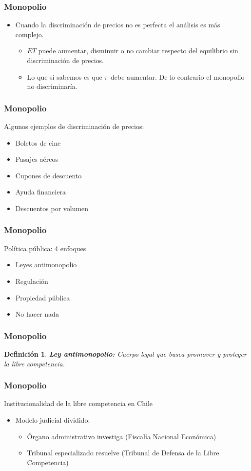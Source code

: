 \documentclass[dvipsnames,table,leqno]{beamer}
\newtheorem{mydef}{Definición}
\begin{document}
		\begin{frame}
			\frametitle{Monopolio}
			\begin{itemize}
				\item Cuando la discriminación de precios no es perfecta el análisis es más complejo.
					\begin{itemize}
						\item $ET$ puede aumentar, disminuir o no cambiar respecto del equilibrio sin discriminación de precios.
						\item Lo que sí sabemos es que $\pi$ debe aumentar. De lo contrario el monopolio no discriminaría.
					\end{itemize}
			\end{itemize}
		\end{frame}	

		\begin{frame}
			\frametitle{Monopolio}
			Algunos ejemplos de discriminación de precios:
			\begin{itemize}
				\item Boletos de cine
				\item Pasajes aéreos
				\item Cupones de descuento
				\item Ayuda financiera
				\item Descuentos por volumen
			\end{itemize}
		\end{frame}	

		\begin{frame}
			\frametitle{Monopolio}
			Política pública: 4 enfoques
			\begin{itemize}
				\item Leyes antimonopolio
				\item Regulación
				\item Propiedad pública
				\item No hacer nada
			\end{itemize}
		\end{frame}	

		\begin{frame}
			\frametitle{Monopolio}
			\begin{mydef}
				\textbf{Ley antimonopolio:} Cuerpo legal que busca promover y proteger la libre competencia.
			\end{mydef}
		\end{frame}	

		\begin{frame}
			\frametitle{Monopolio}
			Institucionalidad de la libre competencia en Chile
			\begin{itemize}
				\item Modelo judicial dividido:
				\begin{itemize}
					\item Órgano administrativo investiga (Fiscalía Nacional Económica)
					\item Tribunal especializado resuelve (Tribunal de Defensa de la Libre Competencia)
				\end{itemize}
			\end{itemize}
		\end{frame}	
\end{document}
